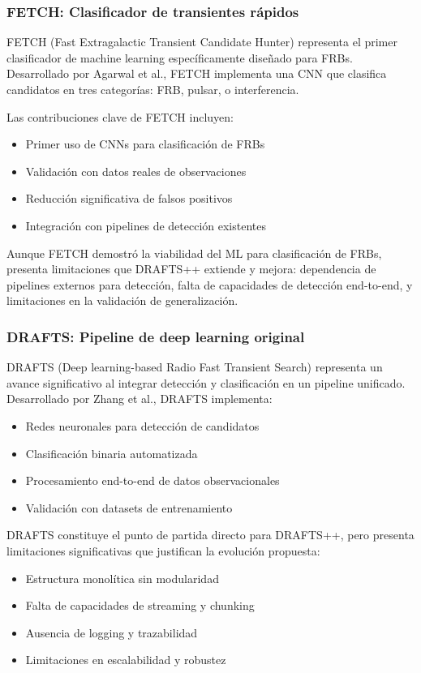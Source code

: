 \subsubsection{FETCH: Clasificador de transientes rápidos}

FETCH (Fast Extragalactic Transient Candidate Hunter) \cite{Agarwal_2020} representa el primer clasificador de machine learning específicamente diseñado para FRBs. Desarrollado por Agarwal et al., FETCH implementa una CNN que clasifica candidatos en tres categorías: FRB, pulsar, o interferencia.

Las contribuciones clave de FETCH incluyen:
\begin{itemize}
    \item Primer uso de CNNs para clasificación de FRBs
    \item Validación con datos reales de observaciones
    \item Reducción significativa de falsos positivos
    \item Integración con pipelines de detección existentes
\end{itemize}

Aunque FETCH demostró la viabilidad del ML para clasificación de FRBs, presenta limitaciones que DRAFTS++ extiende y mejora: dependencia de pipelines externos para detección, falta de capacidades de detección end-to-end, y limitaciones en la validación de generalización.

\subsubsection{DRAFTS: Pipeline de deep learning original}

DRAFTS (Deep learning-based Radio Fast Transient Search) \cite{zhang2024drafts} representa un avance significativo al integrar detección y clasificación en un pipeline unificado. Desarrollado por Zhang et al., DRAFTS implementa:

\begin{itemize}
    \item Redes neuronales para detección de candidatos
    \item Clasificación binaria automatizada
    \item Procesamiento end-to-end de datos observacionales
    \item Validación con datasets de entrenamiento
\end{itemize}

DRAFTS constituye el punto de partida directo para DRAFTS++, pero presenta limitaciones significativas que justifican la evolución propuesta:
\begin{itemize}
    \item Estructura monolítica sin modularidad
    \item Falta de capacidades de streaming y chunking
    \item Ausencia de logging y trazabilidad
    \item Limitaciones en escalabilidad y robustez
\end{itemize}


